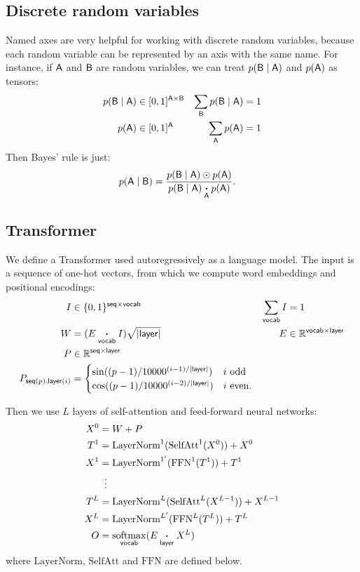 \documentclass{article}
\newcommand{\reals}{\mathbb{R}}
\begin{document}
\subsection{Discrete random variables}

Named axes are very helpful for working with discrete random variables, because each random variable can be represented by an axis with the same name. For instance, if $\mathsf{A}$ and $\mathsf{B}$ are random variables, we can treat $p(\mathsf{B} \mid \mathsf{A})$ and $p(\mathsf{A})$ as tensors:
\begin{align*}
p(\mathsf{B} \mid \mathsf{A}) &\in [0, 1]^{\mathsf{A} \times \mathsf{B}} & \sum\limits_{\mathsf{B}} p(\mathsf{B}\mid \mathsf{A}) &= 1 \\
p(\mathsf{A}) &\in [0, 1]^{\mathsf{A}} & \sum\limits_{\mathsf{A}} p(\mathsf{A}) &= 1
\end{align*}
Then Bayes' rule is just:
\begin{align*}
p(\mathsf{A} \mid \mathsf{B}) &= \frac{p(\mathsf{B} \mid \mathsf{A}) \odot p(\mathsf{A})}{p(\mathsf{B} \mid \mathsf{A}) \mathbin{\mathop{\boldsymbol\cdot}\limits_{\mathsf{A}}} p(\mathsf{A})}.
\end{align*}

\subsection{Transformer}
\label{sec:transformer}

We define a Transformer used autoregressively as a language model.
The input is a sequence of one-hot vectors, from which we compute word embeddings and positional encodings:
\begin{align*}
  I &\in \{0, 1\}^{\name{seq} \times \name{vocab}} & \nsum{vocab} I &= 1 \\
  W &= (E \ndot{vocab} I)\sqrt{|\name{layer}|} & E &\in \reals^{\name{vocab} \times \name{layer}} \\
  P &\in \reals^{\name{seq} \times \name{layer}} \\
  P_{\nidx{seq}{p}, \nidx{layer}{i}} &= \begin{cases}
    \sin((p-1) / 10000^{(i-1) / |\name{layer}|}) & \text{$i$ odd} \\ 
    \cos((p-1) / 10000^{(i-2) / |\name{layer}|}) & \text{$i$ even.}
  \end{cases}
\end{align*}

Then we use $L$ layers of self-attention and feed-forward neural networks:
\begin{align*} 
X^0 &= W+P \\
T^1 &= \text{LayerNorm}^1(\text{SelfAtt}^1(X^0)) + X^0\\
X^1 &= \text{LayerNorm}^{1'}(\text{FFN}^1(T^1)) + T^1\\
&\vdotswithin{=} \\
T^{L} &= \text{LayerNorm}^L(\text{SelfAtt}^L(X^{L-1})) + X^{L-1}\\
X^{L} &= \text{LayerNorm}^{L'}(\text{FFN}^L(T^L)) + T^L\\
O &= \nfun{vocab}{softmax}(E \ndot{layer} X^L)
\end{align*}
where $\text{LayerNorm}$, $\text{SelfAtt}$ and $\text{FFN}$ are defined below.
\end{document}
